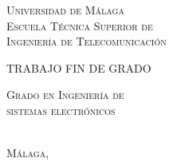 
\thispagestyle{empty}


	\begin{center}
		\Large \scshape
		Universidad de Málaga\\
		\bigskip
		Escuela Técnica Superior de\\
		Ingeniería de Telecomunicación
	\end{center}

	\bigskip


\bigskip

	\bigskip \bigskip \bigskip \bigskip

	\begin{center}
		\Large \scshape
		TRABAJO FIN DE GRADO
	\end{center}

	\bigskip \bigskip \bigskip \bigskip

	\begin{center}
		\huge \scshape
		\tfgtitlename %
	\end{center}

	\vfill

	\begin{center}
		\Large \scshape
		Grado en Ingeniería de\\
		sistemas electrónicos
	\end{center}

	\bigskip \bigskip \bigskip \bigskip


	\begin{flushright}
		\large \scshape
		\tfgauthorname \\%
		Málaga, \tfganno %
	\end{flushright}



\blankpage

